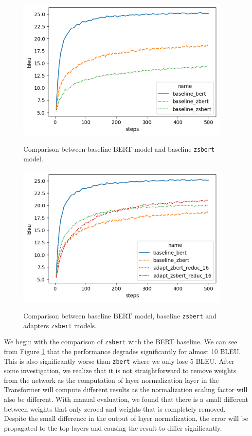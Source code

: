 \begin{figure}[h]
    {\includegraphics[width=0.95\textwidth]{img/baseline_zsbert.png}}
    \centering
    \caption{Comparison between baseline BERT model and baseline \texttt{zsbert} model.}
    \label{img:baseline_zsbert}
\end{figure}

\begin{figure}[h]
    {\includegraphics[width=0.95\textwidth]{img/adapter_zsbert.png}}
    \centering
    \caption{Comparison between baseline BERT model, baseline \texttt{zsbert} and adapters \texttt{zsbert} models.}
    \label{img:adapter_zsbert}
\end{figure}

We begin with the comparison of \texttt{zsbert} with the BERT baseline. We can see from Figure \ref{img:baseline_zsbert} that the performance degrades significantly for almost 10 BLEU. This is also significantly worse than \texttt{zbert} where we only lose 5 BLEU. After some investigation, we realize that it is not straightforward to remove weights from the network as the computation of layer normalization layer in the Transformer will compute different results as the normalization scaling factor will also be different. With manual evaluation, we found that there is a small different between weights that only zeroed and weights that is completely removed. Despite the small difference in the output of layer normalization, the error will be propagated to the top layers and causing the result to differ significantly.

